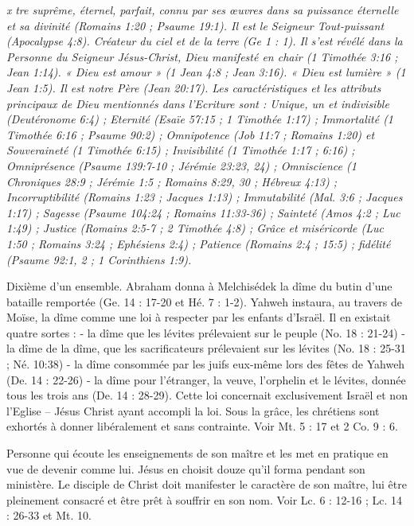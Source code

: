 \begin{multicols}{2}
\textit{x}\newline
{}\textit{tre suprême, éternel, parfait, connu par ses œuvres dans sa puissance éternelle et sa divinité (Romains 1:20 ; Psaume 19:1). Il est le Seigneur Tout-puissant (Apocalypse 4:8). Créateur du ciel et de la terre (Ge 1 : 1). Il s'est révélé dans la Personne du Seigneur Jésus-Christ, Dieu manifesté en chair (1 Timothée 3:16 ; Jean 1:14). « Dieu est amour » (1 Jean 4:8 ; Jean 3:16). « Dieu est lumière » (1 Jean 1:5). Il est notre Père (Jean 20:17). Les caractéristiques et les attributs principaux de Dieu mentionnés dans l'Ecriture sont : Unique, un et indivisible (Deutéronome 6:4) ; Eternité (Esaïe 57:15 ; 1 Timothée 1:17) ; Immortalité (1 Timothée 6:16 ; Psaume 90:2) ; Omnipotence (Job 11:7 ; Romains 1:20) et Souveraineté (1 Timothée 6:15) ; Invisibilité (1 Timothée 1:17 ; 6:16) ; Omniprésence (Psaume 139:7-10 ; Jérémie 23:23, 24) ; Omniscience (1 Chroniques 28:9 ; Jérémie 1:5 ; Romains 8:29, 30 ; Hébreux 4:13) ; Incorruptibilité (Romains 1:23 ; Jacques 1:13) ; Immutabilité (Mal. 3:6 ; Jacques 1:17) ; Sagesse (Psaume 104:24 ; Romains 11:33-36) ; Sainteté (Amos 4:2 ; Luc 1:49) ; Justice (Romains 2:5-7 ; 2 Timothée 4:8) ; Grâce et miséricorde (Luc 1:50 ; Romains 3:24 ; Ephésiens 2:4) ; Patience (Romains 2:4 ; 15:5) ; fidélité (Psaume 92:1, 2 ; 1 Corinthiens 1:9).}\newline

\textit{}\newline
Dixième d’un ensemble. Abraham donna à Melchisédek la dîme du butin d'une bataille remportée (Ge. 14 : 17-20 et Hé. 7 : 1-2). Yahweh instaura, au travers de Moïse, la dîme comme une loi à respecter par les enfants d’Israël. Il en existait quatre sortes :
- la dîme que les lévites prélevaient sur le peuple (No. 18 : 21-24)
- la dîme de la dîme, que les sacrificateurs prélevaient sur les lévites (No. 18 : 25-31 ; Né. 10:38)
- la dîme consommée par les juifs eux-même lors des fêtes de Yahweh (De. 14 : 22-26)
- la dîme pour l’étranger, la veuve, l’orphelin et le lévites, donnée tous les trois ans (De. 14 : 28-29).
Cette loi concernait exclusivement Israël et non l’Eglise – Jésus Christ ayant accompli la loi. Sous la grâce, les chrétiens sont exhortés à donner libéralement et sans contrainte. Voir Mt. 5 : 17 et 2 Co. 9 : 6.

\textit{}\newline
Personne qui écoute les enseignements de son maître et les met en pratique en vue de devenir comme lui. Jésus en choisit douze qu’il forma pendant son ministère. Le disciple de Christ doit manifester le caractère de son maître, lui être pleinement consacré et être prêt à souffrir en son nom. Voir Lc. 6 : 12-16 ; Lc. 14 : 26-33 et Mt. 10.


\end{multicols}
